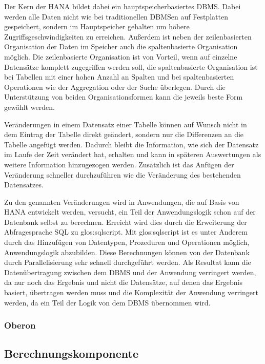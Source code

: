 Der Kern der \gls{HANA} bildet dabei ein hauptspeicherbasiertes \gls{DBMS}. Dabei werden alle Daten nicht wie bei traditionellen \gls{DBMS}en auf Festplatten gespeichert, sondern im Hauptspeicher gehalten um höhere Zugriffsgeschwindigkeiten zu erreichen. Außerdem ist neben der zeilenbasierten Organisation der Daten im Speicher auch die spaltenbasierte Organisation möglich. Die zeilenbasierte Organisation ist von Vorteil, wenn auf einzelne Datensätze komplett zugegriffen werden soll, die spaltenbasierte Organisation ist bei Tabellen mit einer hohen Anzahl an Spalten und bei spaltenbasierten Operationen wie der Aggregation oder der Suche überlegen. Durch die Unterstützung von beiden Organisationsformen kann die jeweils beste Form gewählt werden.

Veränderungen in einem Datensatz einer Tabelle können auf Wunsch nicht in dem Eintrag der Tabelle direkt geändert, sondern nur die Differenzen an die Tabelle angefügt werden. Dadurch bleibt die Information, wie sich der Datensatz im Laufe der Zeit verändert hat, erhalten und kann in späteren Auswertungen als weitere Information hinzugezogen werden. Zusätzlich ist das Anfügen der Veränderung schneller durchzuführen wie die Veränderung des bestehenden Datensatzes.

Zu den genannten Veränderungen wird in Anwendungen, die auf Basis von \gls{HANA} entwickelt werden, versucht, ein Teil der Anwendungslogik schon auf der Datenbank selbst zu berechnen. Erreicht wird dies durch die Erweiterung der Abfragesprache \gls{SQL} zu \gls{glos:sqlscript}. Mit \gls{glos:sqlscript} ist es unter Anderem durch das Hinzufügen von Datentypen, Prozeduren und Operationen möglich, Anwendungslogik abzubilden. Diese Berechnungen können von der Datenbank durch Parallelisierung sehr schnell durchgeführt werden. Als Resultat kann die Datenübertragung zwischen dem \gls{DBMS} und der Anwendung verringert werden, da nur noch das Ergebnis und nicht die Datensätze, auf denen das Ergebnis basiert, übertragen werden muss und die Komplexität der Anwendung verringert werden, da ein Teil der Logik von dem \gls{DBMS} übernommen wird.


\subsubsection{Oberon}
\subsection{Berechnungskomponente}
